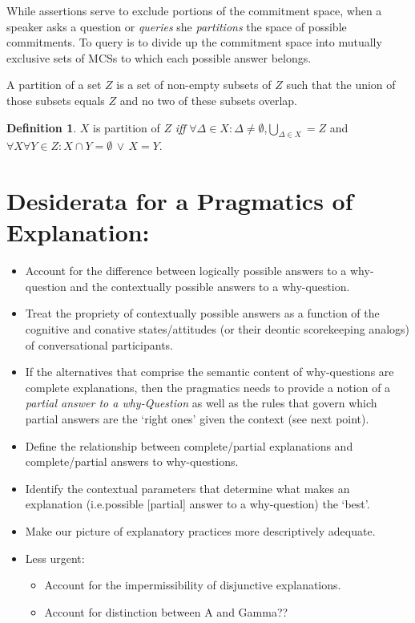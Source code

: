 \documentclass{article}                     %
\theoremstyle{definition}
\newtheorem{definition}{Definition}[section]
\begin{document}
While assertions serve to exclude portions of the commitment space, when a speaker asks a question or \textit{queries} she \textit{partitions} the space of possible commitments. To query is to divide up the commitment space into mutually exclusive sets of MCSs to which each possible answer belongs. 

A partition of a set $ Z $ is a set of non-empty subsets of $ Z $ such that the union of those subsets equals $ Z $ and no two of these subsets overlap.

\begin{definition}
\item $ X $ is partition of $ Z $ \textit{iff} $ \forall\Delta \in X: \Delta \neq \emptyset$,$ \bigcup\limits_{\Delta \in X}=  Z$ and $ \forall X \forall Y \in Z: X \cap Y = \emptyset \,\vee\, X = Y $.
\end{definition}





\vspace{3cm}

\section{Desiderata for a Pragmatics of Explanation:}
\begin{itemize}
\item Account for the difference between logically possible answers to a why-question and the contextually possible answers  to a why-question.
\item Treat the propriety of contextually possible answers as a function of the cognitive and conative states/attitudes (or their deontic scorekeeping analogs) of conversational participants.
\item If the alternatives that comprise the semantic content of why-questions are complete explanations, then the pragmatics needs to provide a notion of a \textit{partial answer to a why-Question} as well as the rules that govern which partial answers are the `right ones' given the context (see next point).
\item Define the relationship between complete/partial explanations and complete/partial answers to why-questions.
\item Identify the contextual parameters that determine what makes an explanation (i.e.possible [partial] answer to a why-question) the `best'.
\item Make our picture of explanatory practices more descriptively adequate.
\item Less urgent:
\begin{itemize}
\item Account for the impermissibility of disjunctive explanations.
\item Account for distinction between A and Gamma??
\end{itemize}
\end{itemize}
\end{document}
